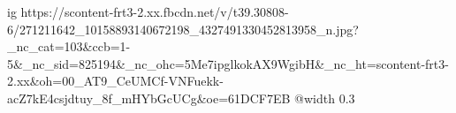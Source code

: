  
 
 
 
 

\ifcmt
  ig https://scontent-frt3-2.xx.fbcdn.net/v/t39.30808-6/271211642_10158893140672198_4327491330452813958_n.jpg?_nc_cat=103&ccb=1-5&_nc_sid=825194&_nc_ohc=5Me7ipglkokAX9WgibH&_nc_ht=scontent-frt3-2.xx&oh=00_AT9_CeUMCf-VNFuekk-acZ7kE4csjdtuy_8f_mHYbGcUCg&oe=61DCF7EB
  @width 0.3
\fi
